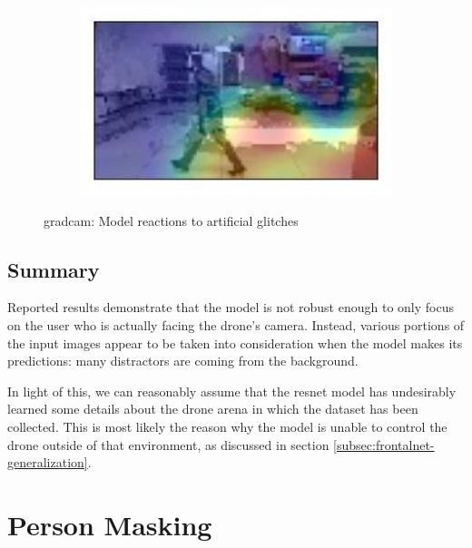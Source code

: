 \begin{figure}[!h]
\begin{center}
\begin{subfigure}[h]{0.24\textwidth}
		\end{subfigure}
		\hfill
		\begin{subfigure}[h]{0.24\textwidth}
			\centering
			\includegraphics[width=1\textwidth]{"contents/images/gradcam/gradcam-glitch-4"}
		\end{subfigure}
	\end{center}
	\vspace{-0.5cm}
	\caption[\gls{gradcam}: Model reactions to artificial glitches]{\gls{gradcam}: Model reactions to artificial glitches}
	\label{fig:gradcam-glitch}
\end{figure}



\subsection{Summary}
\label{subsec:proposed-approach}

Reported results demonstrate that the model is not robust enough to only focus on the user who is actually facing the drone's camera. Instead, various portions of the input images appear to be taken into consideration when the model makes its predictions: many distractors are coming from the background.

In light of this, we can reasonably assume that the \gls{resnet} model has undesirably learned some details about the drone arena in which the dataset has been collected. This is most likely the reason why the model is unable to control the drone outside of that environment, as discussed in section \ref{subsec:frontalnet-generalization}.




\section{Person Masking}
\label{sec:masking}

